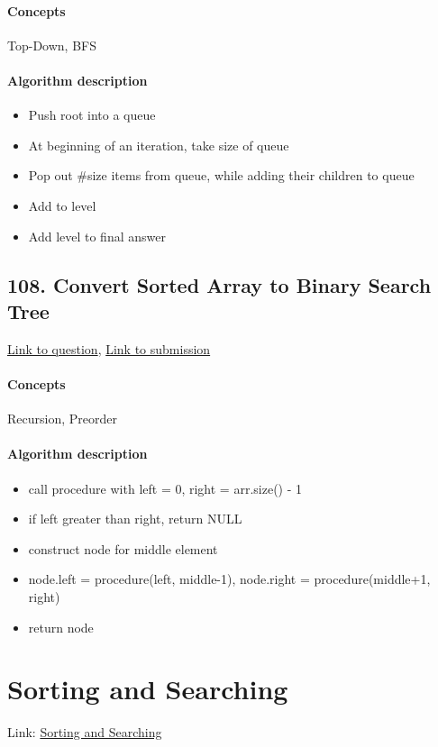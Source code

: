 \documentclass[11pt]{book}
\begin{document}
\paragraph{Concepts}
Top-Down, BFS
\paragraph{Algorithm description}
\begin{itemize}
    \item Push root into a queue
    \item At beginning of an iteration, take size of queue
    \item Pop out \#size items from queue, while adding their children to queue
    \item Add to level
    \item Add level to final answer
\end{itemize}

\subsection{108. Convert Sorted Array to Binary Search Tree}
\href{https://leetcode.com/problems/convert-sorted-array-to-binary-search-tree/}{Link to question},
\href{https://leetcode.com/submissions/detail/335241263/}{Link to submission}
\paragraph{Concepts}
Recursion, Preorder
\paragraph{Algorithm description}
\begin{itemize}
    \item call procedure with left = 0, right = arr.size() - 1
    \item if left greater than right, return NULL
    \item construct node for middle element
    \item node.left = procedure(left, middle-1), node.right = procedure(middle+1, right)
    \item return node
\end{itemize}

\newpage

\section{Sorting and Searching}
Link: \href{https://leetcode.com/explore/featured/card/top-interview-questions-easy/96/sorting-and-searching/}{Sorting and Searching}
\end{document}
